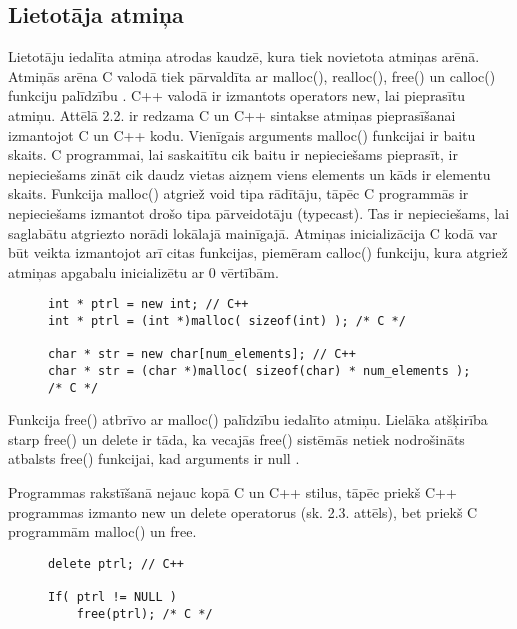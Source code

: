 \subsection{Lietotāja atmiņa}
Lietotāju iedalīta atmiņa atrodas kaudzē, kura tiek novietota atmiņas arēnā. 
Atmiņās arēna C valodā tiek pārvaldīta ar malloc(), realloc(), free() un calloc() funkciju palīdzību \cite {atparv}.
C++ valodā ir izmantots operators new, lai pieprasītu atmiņu.   
Attēlā 2.2. ir redzama C un C++ sintakse atmiņas pieprasīšanai izmantojot C un C++ kodu.
Vienīgais arguments malloc() funkcijai ir baitu skaits.
C programmai, lai saskaitītu cik baitu ir nepieciešams pieprasīt, ir nepieciešams zināt cik daudz vietas aizņem viens elements un kāds ir elementu skaits.
Funkcija malloc() atgriež void tipa rādītāju, tāpēc C programmās ir nepieciešams izmantot drošo tipa pārveidotāju (typecast). 
Tas ir nepieciešams, lai saglabātu atgriezto norādi lokālajā mainīgajā. Atmiņas inicializācija C kodā
var būt veikta izmantojot arī citas funkcijas, piemēram calloc() funkciju, kura atgriež atmiņas apgabalu inicializētu ar 0 vērtībām.

\begin{figure}[h]
\begin{lstlisting}
int * ptrl = new int; // C++
int * ptrl = (int *)malloc( sizeof(int) ); /* C */

char * str = new char[num_elements]; // C++
char * str = (char *)malloc( sizeof(char) * num_elements ); /* C */
\end{lstlisting}
\caption{\textbf{\fontsize{11}{12}\selectfont {Dinamiskās atmiņas iedalīšana C un C++}}}
\end{figure}


Funkcija free() atbrīvo ar malloc() palīdzību iedalīto atmiņu.
Lielāka atšķirība starp free() un delete ir tāda, ka vecajās free() sistēmās netiek nodrošināts atbalsts free() funkcijai, kad arguments ir null \cite{POCF}. 

Programmas rakstīšanā nejauc kopā C un C++ stilus, tāpēc priekš C++ programmas izmanto 
new un delete operatorus (sk. 2.3. attēls), bet priekš C programmām malloc() un free.


\begin{figure}[h]
\begin{lstlisting}
delete ptrl; // C++

If( ptrl != NULL )
	free(ptrl); /* C */
\end{lstlisting}
\caption{\textbf{\fontsize{11}{12}\selectfont {Dinamiskās atmiņas atbrīvošana C un C++}}}
\end{figure}


